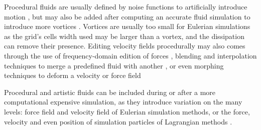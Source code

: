 Procedural fluids are usually defined by noise functions to artificially introduce motion \cite{Bridson2007c}, but may also be added after computing an accurate fluid simulation to introduce more vortices \cite{Wang2025}. Vortices are usually too small for Eulerian simulations as the grid's cells width used may be larger than a vortex, and the dissipation can remove their presence. Editing velocity fields procedurally may also comes through the use of frequency-domain edition of forces \cite{Forootaninia2020, Tang2021}, blending and interpolation techniques to merge a predefined fluid with another \cite{Raveendran2014}, or even morphing techniques to deform a velocity or force field \cite{Lu2019,Raveendran2012,Flynn2019}

Procedural and artistic fluids can be included during or after a more computational expensive simulation, as they introduce variation on the many levels: force field and velocity field of Eulerian simulation methods, or the force, velocity and even position of simulation particles of Lagrangian methods \cite{Sims1990}.





